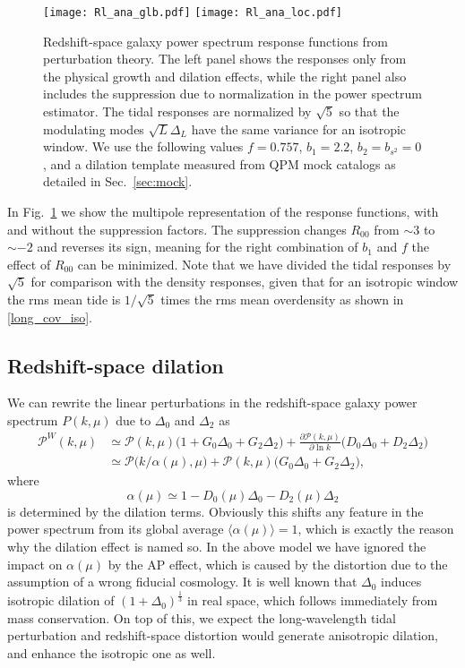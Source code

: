 \documentclass[a4paper,11pt]{article}
\newcommand{\Pdimless}{\mathcal{P}}
\begin{document}
\begin{figure}[tbp]
    \centering
    \texttt{[image: Rl\_ana\_glb.pdf]}
    \texttt{[image: Rl\_ana\_loc.pdf]}
    \caption{Redshift-space galaxy power spectrum response functions from perturbation theory.
    The left panel shows the responses only from the physical growth and
    dilation effects, while the right panel also includes the suppression due
    to normalization in the power spectrum estimator.
    The tidal responses are normalized by $\sqrt 5$ so that the modulating
    modes $\sqrt L\Delta_L$ have the same variance for an isotropic window.
    We use the following
    values $f=0.757$, $b_1=2.2$, $b_2=b_{s^2}=0$, and a dilation template
    measured from QPM mock catalogs as detailed in Sec.~\ref{sec:mock}.}
    \label{fig:Rl_ana}
\end{figure}

In Fig.~\ref{fig:Rl_ana} we show the multipole representation of the response
functions, with and without the suppression factors.
The suppression changes $R_{00}$ from $\sim3$ to $\sim-2$ and reverses its
sign, meaning for the right combination of $b_1$ and $f$ the effect of $R_{00}$
can be minimized.
Note that we have divided the tidal responses by $\sqrt5$ for comparison with
the density responses, given that for an isotropic window the rms mean tide is
$1/\sqrt5$ times the rms mean overdensity as shown in \eqref{long_cov_iso}.




\subsection{Redshift-space dilation}
\label{sub:dilation}

We can rewrite the linear perturbations in the redshift-space galaxy power
spectrum $P(k,\mu)$ due to $\Delta_0$ and $\Delta_2$ as
\begin{align}
    \Pdimless^W(k,\mu) &\simeq \Pdimless(k,\mu)
        \bigl( 1 + G_0\Delta_0 + G_2\Delta_2 \bigr)
        + \frac{\partial \Pdimless(k,\mu)}{\partial\ln k}
            \bigl( D_0\Delta_0 + D_2\Delta_2 \bigr) \nonumber\\
    &\simeq \Pdimless\bigl(k / \alpha(\mu), \mu\bigr)
        + \Pdimless(k,\mu) \bigl( G_0\Delta_0 + G_2\Delta_2 \bigr),
\end{align}
where
\begin{equation}
    \alpha(\mu)\simeq1 - D_0(\mu)\Delta_0 - D_2(\mu)\Delta_2
    \label{dilation}
\end{equation}
is determined by the dilation terms.
Obviously this shifts any feature in the power spectrum from its global
average $\langle\alpha(\mu)\rangle=1$, which is exactly the reason why the
dilation effect is named so.
In the above model we have ignored the impact on $\alpha(\mu)$ by the AP
effect, which is caused by the distortion due to the assumption of a wrong
fiducial cosmology.
It is well known that $\Delta_0$ induces isotropic dilation of
$(1+\Delta_0)^\frac13$ in real space, which follows immediately from mass
conservation.
On top of this, we expect the long-wavelength tidal perturbation and
redshift-space distortion would generate anisotropic dilation, and enhance the
isotropic one as well.
\end{document}
